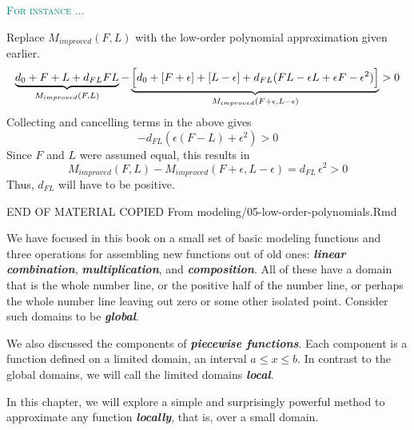 \documentclass[
  letterpaper,
  DIV=11,
  numbers=noendperiod,
  oneside]{scrreprt}
\newenvironment{example}%
{%
\textcolor{teal}{\hrulefill}%
  \par\vspace{.3\baselineskip}%
  \textcolor{teal}{\scshape For instance ...}%
  \par\vspace{\baselineskip}%
}%
{\textcolor{teal}{\hrulefill}}
\begin{document}
\begin{example}
Replace \(M_{improved}(F, L)\) with the low-order polynomial
approximation given earlier.
\[\underbrace{d_0 + F + L + d_{FL} FL}_{M_{improved}(F, L)} - \underbrace{\left[{\large\strut} d_0 + \left[ F + \epsilon\right] + \left[ L - \epsilon\right] + d_{FL} (FL -\epsilon L + \epsilon F -  \epsilon^2)\right]}_{M_{improved}(F+\epsilon, L-\epsilon)} > 0\]
Collecting and cancelling terms in the above gives
\[- d_{FL}(\epsilon(F-L) + \epsilon^2) > 0\] Since \(F\) and \(L\) were
assumed equal, this results in
\[M_{improved}(F, L) - M_{improved}(F+\epsilon, L-\epsilon) = d_{FL}\, \epsilon^2 > 0\]
Thus, \(d_{FL}\) will have to be positive.

\end{example}

END OF MATERIAL COPIED From modeling/05-low-order-polynomials.Rmd

We have focused in this book on a small set of basic modeling functions
and three operations for assembling new functions out of old ones:
\textbf{\emph{linear combination}}, \textbf{\emph{multiplication}}, and
\textbf{\emph{composition}}. All of these have a domain that is the
whole number line, or the positive half of the number line, or perhaps
the whole number line leaving out zero or some other isolated point.
Consider such domains to be \textbf{\emph{global}}.

We also discussed the components of \textbf{\emph{piecewise functions}}.
Each component is a function defined on a limited domain, an interval
\(a \leq x \leq b\). In contrast to the global domains, we will call the
limited domains \textbf{\emph{local}}.

In this chapter, we will explore a simple and surprisingly powerful
method to approximate any function \textbf{\emph{locally}}, that is,
over a small domain.
\end{document}
